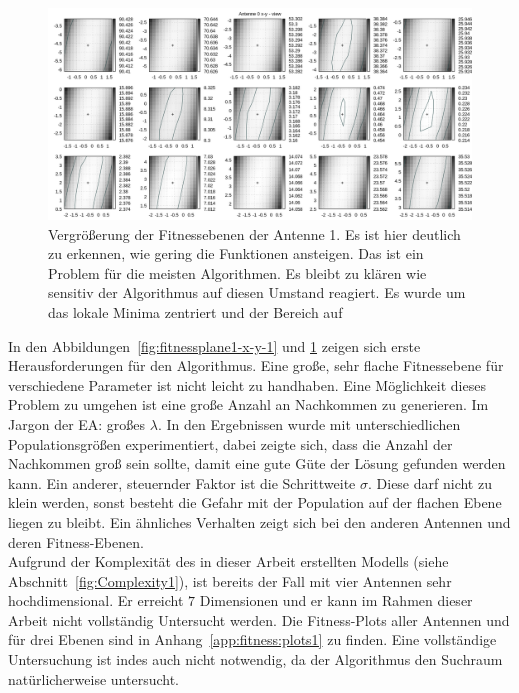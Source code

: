 \begin{figure}[ht!]
  \caption[Fitness Ebenen Heatmap, vergrößert]{Vergrößerung der Fitnessebenen der Antenne 1. Es ist hier deutlich zu erkennen, wie gering die Funktionen ansteigen. Das ist ein Problem für die meisten Algorithmen. Es bleibt zu klären wie sensitiv der Algorithmus auf diesen Umstand reagiert. Es wurde um das lokale Minima zentriert und der Bereich auf} %
  \begin{center}
   \includegraphics[width=\textwidth]{img/fitness/xy_a0zoomed.png}
  \end{center}
  \label{fig:fitnessplane1-x-y-zoom-1}
%
\end{figure}
%
In den Abbildungen~\ref{fig:fitnessplane1-x-y-1} und \ref{fig:fitnessplane1-x-y-zoom-1} zeigen sich erste Herausforderungen für den Algorithmus. Eine große, sehr flache Fitnessebene für verschiedene Parameter ist nicht leicht zu handhaben. Eine Möglichkeit dieses Problem zu umgehen ist eine große Anzahl an Nachkommen zu generieren. Im Jargon der EA: großes $\lambda$. In den Ergebnissen wurde mit unterschiedlichen Populationsgrößen experimentiert, dabei zeigte sich, dass die Anzahl der Nachkommen groß sein sollte, damit eine gute Güte der Lösung gefunden werden kann. Ein anderer, steuernder Faktor ist die Schrittweite $\sigma$. Diese darf nicht zu klein werden, sonst besteht die Gefahr mit der Population auf der flachen Ebene liegen zu bleibt. Ein ähnliches Verhalten zeigt sich bei den anderen Antennen und deren Fitness-Ebenen.\\
Aufgrund der Komplexität des in dieser Arbeit erstellten Modells (siehe Abschnitt~\ref{fig:Complexity1}), ist bereits der Fall mit vier Antennen sehr hochdimensional. Er erreicht $7$ Dimensionen und er kann im Rahmen dieser Arbeit nicht vollständig Untersucht werden. Die Fitness-Plots aller Antennen und für drei Ebenen sind in Anhang~\ref{app:fitness:plots1} zu finden. Eine vollständige Untersuchung ist indes auch nicht notwendig, da der Algorithmus den Suchraum natürlicherweise untersucht. 
